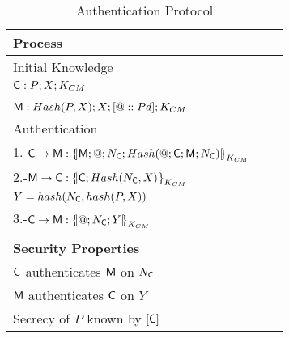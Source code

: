 \begin{table}[htb]
\footnotesize
\begin{center}
\caption{Authentication Protocol}
\label{table:AuthProtocol}
\begin{tabular}{|l|l|l|}
\hline
{\bf Process}                                                                     \\\hline\hline
            Initial Knowledge                                                     \\
            $\textsf{C}:P; X ; K_{CM}$                               \\
            \hspace{5mm}                                                 \\ 
            $\textsf{M}:Hash(P,X); X ;[@::Pd] ; K_{CM}$ \\\hline \hline
            Authentication                                                         \\
            1.-$\Client\rightarrow \Server: \fat{\Server \lnk @ \lnk N_{\Client} \lnk 
                                              Hash(@\lnk \Client \lnk \Server \lnk N_\Client)}_{K_{\client\serverW}}$  \\ 
            2.-$\Server\rightarrow \Client: \fat{\Client \lnk Hash(N_{\Client},X)}_{K_{\client\serverW}}$ \\ 
            \hspace{5mm} $Y=hash(N_{\textsf{C}},hash(P,X))$                          \\              
            3.-$\Client\rightarrow \Server: \fat{@\lnk N_{\Client}\lnk Y}_{K_{\client\serverW}}$            \\ \\ \hline  \hline
            \textbf{Security Properties}                        \\
            \hspace{5mm} $\textsf{C}$ authenticates $\textsf{M}$ on $N_{\textsf{C}}$        \\
            \hspace{5mm} $\textsf{M}$ authenticates $\textsf{C}$ on $Y$  \\ 
            \hspace{5mm} Secrecy of $P$ known by $[\textsf{C}]$ \\\hline \hline
\end{tabular}
\end{center}
\end{table}
\normalsize


